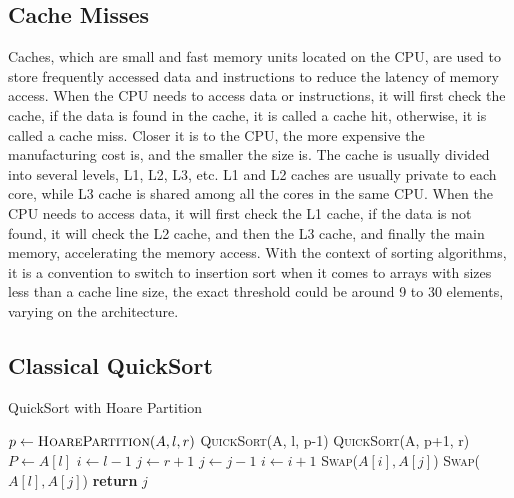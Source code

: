 \documentclass{article}
\begin{document}
\subsection{Cache Misses}
Caches, which are small and fast memory units located on the CPU, are used to store frequently accessed data and instructions to reduce the latency of memory access.
When the CPU needs to access data or instructions, it will first check the cache, if the data is found in the cache, it is called a cache hit, otherwise, it is called a cache miss.
Closer it is to the CPU, the more expensive the manufacturing cost is, and the smaller the size is. The cache is usually divided into several levels, L1, L2, L3, etc.
L1 and L2 caches are usually private to each core, while L3 cache is shared among all the cores in the same CPU.
When the CPU needs to access data, it will first check the L1 cache, if the data is not found, it will check the L2 cache, and then the L3 cache, and finally the main memory, accelerating the memory access.
With the context of sorting algorithms, it is a convention to switch to insertion sort when it comes to arrays with sizes less than a cache line size, the exact threshold could be around 9 to 30 elements, varying on the architecture.

\subsection{Classical QuickSort}
\begin{algorithm}[H]
    \caption{QuickSort with Hoare Partition}\label{HoarePartition}
    \begin{algorithmic}[1]
        \State $p \gets \textsc{HoarePartition}(A, l, r)$
        \State \textsc{QuickSort}(A, l, p-1)
        \State \textsc{QuickSort}(A, p+1, r)
        \EndIf
        \EndProcedure
        \State $P \gets A[l]$ 
        \State $i \gets l - 1$
        \State $j \gets r + 1$
        \Repeat
        \State $j \gets j - 1$
        \Repeat
        \State $i \gets i + 1$
        \State \textsc{Swap}($A[i], A[j]$)
        \EndWhile
        \State \textsc{Swap}($A[l], A[j]$) 
        \State \textbf{return} $j$
        \EndProcedure
    \end{algorithmic}
\end{algorithm}
\end{document}
